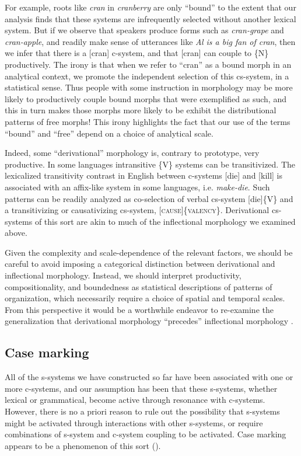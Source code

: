  For example, roots like \textit{cran} in \textit{cranberry} are only “bound” to the extent that our analysis finds that these systems are infrequently selected without another lexical system. But if we observe that speakers produce forms such as \textit{cran-grape} and \textit{cran-apple}, and readily make sense of utterances like \textit{Al is a big fan of cran}, then we infer that there is a [cran] c-system, and that [cran] can couple to \{N\} productively. The irony is that when we refer to “cran” as a bound morph in an analytical context, we promote the independent selection of this cs-system, in a statistical sense. Thus people with some instruction in morphology may be more likely to productively couple bound morphs that were exemplified as such, and this in turn makes those morphs more likely to be exhibit the distributional patterns of free morphs! This irony highlights the fact that our use of the terms “bound” and “free” depend on a choice of analytical scale.

  Indeed, some “derivational” morphology is, contrary to prototype, very productive. In some languages intransitive \{V\} systems can be transitivized. The lexicalized transitivity contrast in English between c-systems [die] and [kill] is associated with an affix-like system in some languages, i.e. \textit{make-die}. Such patterns can be readily analyzed as co-selection of verbal cs-system [die]\{V\} and a transitivizing or causativizing cs-system, [\textsc{cause}]\{\textsc{valency}\}. Derivational cs-systems of this sort are akin to much of the inflectional morphology we examined above. 

  Given the complexity and scale-dependence of the relevant factors, we should be careful to avoid imposing a categorical distinction between derivational and inflectional morphology. Instead, we should interpret productivity, compositionality, and boundedness as statistical descriptions of patterns of organization, which necessarily require a choice of spatial and temporal scales. From this perspective it would be a worthwhile endeavor to re-examine the generalization that derivational morphology “precedes” inflectional morphology \citep{Booij1996}.

\subsection{Case marking}

All of the s-systems we have constructed so far have been associated with one or more c-systems, and our assumption has been that these s-systems, whether lexical or grammatical, become active through resonance with c-systems. However, there is no a priori reason to rule out the possibility that s-systems might be activated through interactions with other s-systems, or require combinations of s-system and c-system coupling to be activated. Case marking appears to be a phenomenon of this sort (\citealt{BobaljikWurmbrand2008,MalchukovSpencer2008}).

